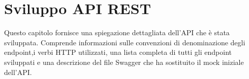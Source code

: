 \chapter{Sviluppo API REST}
\label{cap:api-rest}

Questo capitolo fornisce una spiegazione dettagliata dell'API che è stata sviluppata. Comprende informazioni sulle convenzioni di denominazione degli endpoint,i verbi HTTP utilizzati, una lista completa di tutti gli endpoint sviluppati e una descrizione del file Swagger che ha sostituito il mock iniziale dell'API.\\



